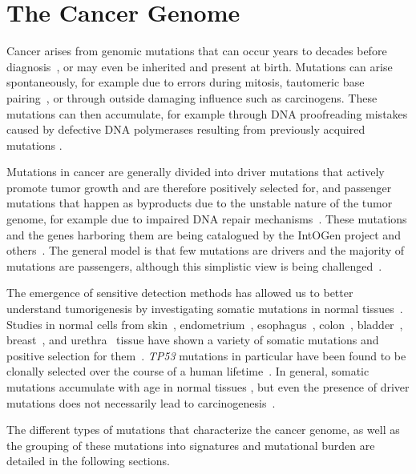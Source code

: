 \documentclass[11pt]{book}
\begin{document}
\section{The Cancer Genome}

Cancer arises from genomic mutations that can occur years to decades before diagnosis~\cite{Gerstung:2020}, or may even be inherited and present at birth. Mutations can arise spontaneously, for example due to errors during mitosis, tautomeric base pairing~\cite{Watson:1953, Kimsey:2018}, or through outside damaging influence such as carcinogens. These mutations can then accumulate, for example through DNA proofreading mistakes caused by defective DNA polymerases resulting from previously acquired mutations \cite{Robinson:2020}.

Mutations in cancer are generally divided into driver mutations that actively promote tumor growth and are therefore positively selected for, and passenger mutations that happen as byproducts due to the unstable nature of the tumor genome, for example due to impaired DNA repair mechanisms~\cite{Stratton:2009}. These mutations and the genes harboring them are being catalogued by the IntOGen project and others~\cite{Akavia:2010, Gonzalez-Perez:2013, Bailey:2018, Martinez-Jiminez:2020}. The general model is that few mutations are drivers and the majority of mutations are passengers, although this simplistic view is being challenged~\cite{Kumar:2020}.

The emergence of sensitive detection methods has allowed us to better understand tumorigenesis by investigating somatic mutations in normal tissues~\cite{Dou:2018, Garcia-Nieto:2019}. Studies in normal cells from skin~\cite{Martincorena:2015, Tang:2020}, endometrium~\cite{Moore:2020}, esophagus~\cite{Martincorena:2018}, colon~\cite{Lee-Six:2019}, bladder~\cite{Lawson:2020}, breast~\cite{Cereser:2020}, and urethra~\cite{Li:2020} tissue have shown a variety of somatic mutations and positive selection for them~\cite{Martincorena:2015, Martincorena:2018, Lee-Six:2019}. \textit{TP53} mutations in particular have been found to be clonally selected over the course of a human lifetime~\cite{Salk:2019}. In general, somatic mutations accumulate with age in normal tissues \cite{Risques:2018}, but even the presence of driver mutations does not necessarily lead to carcinogenesis~\cite{Kennedy:2019}.

The different types of mutations that characterize the cancer genome, as well as the grouping of these mutations into signatures and mutational burden are detailed in the following sections.
\end{document}
